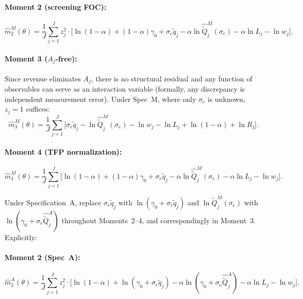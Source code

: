 \documentclass[11pt]{article}
\begin{document}
\paragraph{Moment 2 (screening FOC):}
\begin{equation}\label{eq:sm2_M}
\hat m_2^M(\theta) = \frac{1}{J}\sum_{j=1}^J z_j^2\cdot\Big[\ln(1-\alpha)+(1-\alpha)\gamma_0+\sigma_e\tilde q_j - \alpha\ln\hat{\tilde Q}_j^M(\sigma_e) - \alpha\ln L_j - \ln w_j\Big].
\end{equation}

\paragraph{Moment 3 ($A_j$-free):} Since revenue eliminates $A_j$, there is no structural residual and any function of observables can serve as an interaction variable (formally, any discrepancy is independent measurement error). Under Spec~M, where only $\sigma_e$ is unknown, $z_j=1$ suffices:
\begin{equation}\label{eq:sm3_M}
\hat m_3^M(\theta) = \frac{1}{J}\sum_{j=1}^J \Big[\sigma_e\tilde q_j - \ln\hat{\tilde Q}_j^M(\sigma_e) - \ln w_j - \ln L_j + \ln(1-\alpha) + \ln R_j\Big].
\end{equation}

\paragraph{Moment 4 (TFP normalization):}
\begin{equation}\label{eq:sm4_M}
\hat m_4^M(\theta) = \frac{1}{J}\sum_{j=1}^J \Big[\ln(1-\alpha)+(1-\alpha)\gamma_0+\sigma_e\tilde q_j - \alpha\ln\hat{\tilde Q}_j^M(\sigma_e) - \alpha\ln L_j - \ln w_j\Big].
\end{equation}

\noindent Under Specification~A, replace $\sigma_e\tilde q_j$ with $\ln(\gamma_0+\sigma_e\tilde q_j)$ and $\ln\tilde Q_j^M(\sigma_e)$ with $\ln(\gamma_0+\sigma_e\hat{\tilde Q}_j^A)$ throughout Moments~2--4, and correspondingly in Moment~3. Explicitly:

\paragraph{Moment 2 (Spec~A):}
\begin{equation}\label{eq:sm2_A}
\hat m_2^A(\theta) = \frac{1}{J}\sum_{j=1}^J z_j^2\cdot\Big[\ln(1-\alpha)+\ln(\gamma_0+\sigma_e\tilde q_j) - \alpha\ln(\gamma_0+\sigma_e\hat{\tilde Q}_j^A) - \alpha\ln L_j - \ln w_j\Big].
\end{equation}
\end{document}
